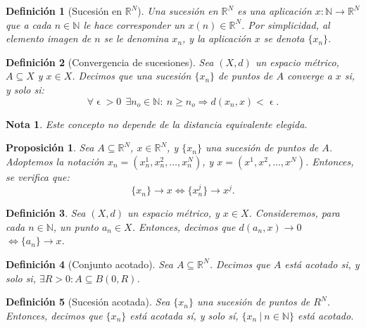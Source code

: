\documentclass[11pt, a4paper, titlepage]{article}
\let\epsilon\upvarepsilon
\theoremstyle{theorem-style}
\newtheorem*{nprop}{Proposición}
\theoremstyle{definition-style}
\newtheorem*{ndef}{Definición}
\theoremstyle{remark-style}
\newtheorem*{nota}{Nota}
\theoremstyle{example-style}
\begin{document}
\begin{ndef}[Sucesión en $\mathbb{R}^N$]
Una sucesión en $\mathbb{R}^N$ es una aplicación $x: \mathbb{N} \longrightarrow \mathbb{R}^N$ que a cada $n\in \mathbb{N}$ le hace corresponder un $x(n) \in \mathbb{R}^N$. Por simplicidad, al elemento imagen de $n$ se le denomina $x_n$, y la aplicación $x$ se denota $\{x_n\}$.
\end{ndef}



\begin{ndef}[Convergencia de sucesiones]
Sea $(X,d)$ un espacio métrico, $A\subseteq X$ y $x\in X$. Decimos que una sucesión $\{x_n\}$ de puntos de $A$ converge a $x$ si, y solo si: $$ \forall \epsilon > 0\ \ \exists n_o \in \mathbb{N}: \ n\ge n_o \Rightarrow d(x_n,x) < \epsilon.$$
\end{ndef}



\begin{nota}
Este concepto no depende de la distancia equivalente elegida.
\end{nota}



\begin{nprop}
Sea $A\subseteq \mathbb{R}^N$, $x\in \mathbb{R}^N$, y $\{x_n\}$ una sucesión de puntos de $A$. Adoptemos la notación $x_n = (x_n^1, x_n^2,\dots,x_n^N)$, y $x=(x^1, x^2,\dots, x^N)$. Entonces, se verifica que:
$$\{x_n\} \rightarrow x \iff \{x_n^j\} \rightarrow x^j.$$
\end{nprop}



\begin{ndef}
Sea $(X,d)$ un espacio métrico, y $x\in X$. Consideremos, para cada $n\in \mathbb{N}$, un punto $a_n \in X$. Entonces, decimos que $d(a_n,x) \rightarrow 0$ $\iff \{a_n\} \rightarrow x$.
\end{ndef}



\begin{ndef}[Conjunto acotado]
Sea $A \subseteq \mathbb{R}^N$. Decimos que $A$ \textit{está acotado} si, y solo si, $\exists R>0: A\subseteq B(0,R)$.
\end{ndef}



\begin{ndef}[Sucesión acotada]
Sea $\{x_n\}$ una sucesión de puntos de $R^N$. Entonces, decimos que $\{x_n\}$ \textit{está acotada} sí, y solo sí, $\{x_n\ | \ n\in \mathbb{N}\}$ está acotado.
\end{ndef}
\end{document}

